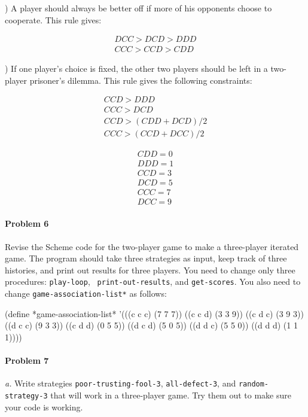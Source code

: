 ) A player should always be better off if more of his
opponents choose to cooperate. This rule gives:

\begin{eqnarray*}
DCC > DCD > DDD \\
CCC > CCD > CDD
\end{eqnarray*}

) If one player's choice is fixed, the other two players should be
left in a two-player prisoner's dilemma. This rule gives the following
constraints: 

\begin{eqnarray*}
CCD > DDD \\
CCC > DCD \\
CCD > (CDD + DCD) / 2 \\
CCC > (CCD + DCC) / 2
\end{eqnarray*}

\begin{eqnarray*}
CDD = 0 \\
DDD = 1 \\
CCD = 3 \\
DCD = 5 \\
CCC = 7 \\
DCC = 9
\end{eqnarray*}

\paragraph{Problem 6}
Revise the Scheme code for the two-player game to make a three-player
iterated game. The program should take three strategies as input, keep
track of three histories, and print out results for three players. You
need to change only three procedures: {\tt play-loop}, {\tt
print-out-results}, and {\tt get-scores}. You also need to change
{\tt *game-association-list*} as follows:

\beginlisp
(define *game-association-list*
  '(((c c c) (7 7 7))
    ((c c d) (3 3 9))
    ((c d c) (3 9 3))
    ((d c c) (9 3 3))
    ((c d d) (0 5 5))
    ((d c d) (5 0 5))
    ((d d c) (5 5 0))
    ((d d d) (1 1 1))))
\endlisp

\paragraph{Problem 7}
{\it a.} Write strategies {\tt poor-trusting-fool-3}, {\tt all-defect-3}, and
{\tt random-strategy-3} that will work in a three-player game. Try
them out to make sure your code is working.

